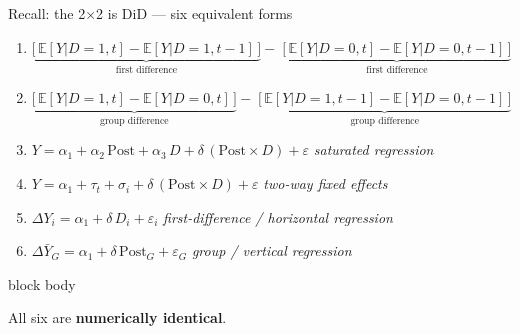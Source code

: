 \documentclass[aspectratio=169,11pt]{beamer}
\newcommand{\emphbox}[1]{%
  \begin{beamercolorbox}[rounded=true,sep=7pt,wd=\linewidth]{block body}%
    \small\color{slate}\raggedright #1%
  \end{beamercolorbox}}
\begin{document}

\begin{frame}{Recall: the 2$\times$2 is DiD --- six equivalent forms}
\vspace{0.2em}
{\footnotesize
\begin{enumerate}\setlength\itemsep{0.25em}

  \item $\underbrace{\bigl[\,\mathbb{E}[Y|D{=}1,t]
         - \mathbb{E}[Y|D{=}1,t{-}1]\,\bigr]}_{\text{first difference}}
        -\;
        \underbrace{\bigl[\,\mathbb{E}[Y|D{=}0,t]
         - \mathbb{E}[Y|D{=}0,t{-}1]\,\bigr]}_{\text{first difference}}$

  \item $\underbrace{\bigl[\,\mathbb{E}[Y|D{=}1,t]
         - \mathbb{E}[Y|D{=}0,t]\,\bigr]}_{\text{group difference}}
        -\;
        \underbrace{\bigl[\,\mathbb{E}[Y|D{=}1,t{-}1]
         - \mathbb{E}[Y|D{=}0,t{-}1]\,\bigr]}_{\text{group difference}}$

  \item $Y = \alpha_1 + \alpha_2\,\mathrm{Post} + \alpha_3\,D
         + \delta\,(\mathrm{Post}\times D) + \varepsilon$
        \hfill{\color{warmgray}\itshape saturated regression}

  \item $Y = \alpha_1 + \tau_t + \sigma_i
         + \delta\,(\mathrm{Post}\times D) + \varepsilon$
        \hfill{\color{warmgray}\itshape two-way fixed effects}

  \item $\Delta Y_i = \alpha_1 + \delta\,D_i + \varepsilon_i$
        \hfill{\color{warmgray}\itshape first-difference / horizontal regression}

  \item $\Delta\bar{Y}_G = \alpha_1 + \delta\,\mathrm{Post}_G + \varepsilon_G$
        \hfill{\color{warmgray}\itshape group / vertical regression}

\end{enumerate}
}
\vspace{0.3em}
\emphbox{All six are \textbf{numerically identical}.}
\end{frame}
\end{document}
